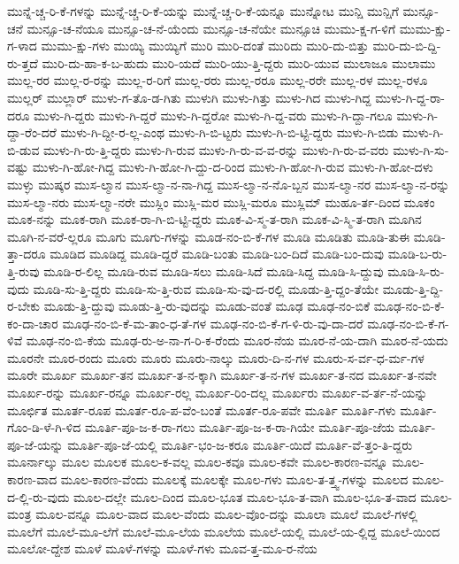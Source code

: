 {ಮುನ್ನೆ-ಚ್ಚ-ರಿ-ಕೆ-ಗಳನ್ನು
ಮುನ್ನೆ-ಚ್ಚ-ರಿ-ಕೆ-ಯನ್ನು
ಮುನ್ನೆ-ಚ್ಚ-ರಿ-ಕೆ-ಯನ್ನೂ
ಮುನ್ನೋಟ
ಮುನ್ಷಿ
ಮುನ್ಷಿಗೆ
ಮುನ್ಸೂ-ಚನೆ
ಮುನ್ಸೂ-ಚ-ನೆಯೂ
ಮುನ್ಸೂ-ಚ-ನೆ-ಯೆಂದು
ಮುನ್ಸೂ-ಚ-ನೆಯೇ
ಮುನ್ಸೂಚಿ
ಮುಮು-ಕ್ಷ-ಗ-ಳಿಗೆ
ಮುಮು-ಕ್ಷು-ಗ-ಳಾದ
ಮುಮು-ಕ್ಷು-ಗಳು
ಮುಯ್ಯಿ
ಮುಯ್ಯಿಗೆ
ಮುರಿ
ಮುರಿ-ದಂತೆ
ಮುರಿದು
ಮುರಿ-ದು-ಬಿತ್ತು
ಮುರಿ-ದು-ಬಿ-ದ್ದಿ-ರು-ತ್ತದೆ
ಮುರಿ-ದು-ಹಾ-ಕ-ಬ-ಹುದು
ಮುರಿ-ಯದೆ
ಮುರಿ-ಯು-ತ್ತಿ-ದ್ದರು
ಮುರಿ-ಯುವ
ಮುಲಾಜೂ
ಮುಲಾಮು
ಮುಲ್ಲ-ರರ
ಮುಲ್ಲ-ರ-ರನ್ನು
ಮುಲ್ಲ-ರ-ರಿಗೆ
ಮುಲ್ಲ-ರರು
ಮುಲ್ಲ-ರರೂ
ಮುಲ್ಲ-ರರೇ
ಮುಲ್ಲ-ರಳ
ಮುಲ್ಲ-ರಳೂ
ಮುಲ್ಲರ್
ಮುಲ್ಲಾರ್
ಮುಳು-ಗ-ತೊ-ಡ-ಗಿತು
ಮುಳುಗಿ
ಮುಳು-ಗಿತ್ತು
ಮುಳು-ಗಿದ
ಮುಳು-ಗಿದ್ದ
ಮುಳು-ಗಿ-ದ್ದ-ರಾ-ದರೂ
ಮುಳು-ಗಿ-ದ್ದರು
ಮುಳು-ಗಿ-ದ್ದರೆ
ಮುಳು-ಗಿ-ದ್ದರೋ
ಮುಳು-ಗಿ-ದ್ದ-ವರು
ಮುಳು-ಗಿ-ದ್ದಾ-ಗಲೂ
ಮುಳು-ಗಿ-ದ್ದಾ-ರೆಂ-ದರೆ
ಮುಳು-ಗಿ-ದ್ದೀ-ರ-ಲ್ಲ-ಎಂಥ
ಮುಳು-ಗಿ-ಬಿ-ಟ್ಟರು
ಮುಳು-ಗಿ-ಬಿ-ಟ್ಟಿ-ದ್ದರು
ಮುಳು-ಗಿ-ಬಿಡು
ಮುಳು-ಗಿ-ಬಿ-ಡುವ
ಮುಳು-ಗಿ-ರು-ತ್ತಿ-ದ್ದರು
ಮುಳು-ಗಿ-ರುವ
ಮುಳು-ಗಿ-ರು-ವ-ವ-ರನ್ನು
ಮುಳು-ಗಿ-ರು-ವ-ವರು
ಮುಳು-ಗಿ-ಸು-ವಷ್ಟು
ಮುಳು-ಗಿ-ಹೋ-ಗಿದ್ದ
ಮುಳು-ಗಿ-ಹೋ-ಗಿ-ದ್ದು-ದ-ರಿಂದ
ಮುಳು-ಗಿ-ಹೋ-ಗಿ-ರುವ
ಮುಳು-ಗಿ-ಹೋ-ದಳು
ಮುಳ್ಳು
ಮುಷ್ಕರ
ಮುಸ-ಲ್ಮಾನ
ಮುಸ-ಲ್ಮಾ-ನ-ನಾ-ಗಿದ್ದ
ಮುಸ-ಲ್ಮಾ-ನ-ನೊ-ಬ್ಬನ
ಮುಸ-ಲ್ಮಾ-ನರ
ಮುಸ-ಲ್ಮಾ-ನ-ರನ್ನು
ಮುಸ-ಲ್ಮಾ-ನರು
ಮುಸ-ಲ್ಮಾ-ನರೇ
ಮುಸ್ಲಿಂ
ಮುಸ್ಲಿ-ಮರ
ಮುಸ್ಲಿ-ಮರೂ
ಮುಸ್ಲಿಮ್
ಮುಹೂ-ರ್ತ-ದಿಂದ
ಮೂಕಂ
ಮೂಕ-ನನ್ನು
ಮೂಕ-ರಾಗಿ
ಮೂಕ-ರಾ-ಗಿ-ಬಿ-ಟ್ಟಿ-ದ್ದರು
ಮೂಕ-ವಿ-ಸ್ಮ-ತ-ರಾಗಿ
ಮೂಕ-ವಿ-ಸ್ಮಿ-ತ-ರಾಗಿ
ಮೂಗಿನ
ಮೂಗಿ-ನ-ವರೆ-ಲ್ಲರೂ
ಮೂಗು
ಮೂಗು-ಗಳನ್ನು
ಮೂಡ-ನಂ-ಬಿ-ಕೆ-ಗಳ
ಮೂಡಿ
ಮೂಡಿತು
ಮೂಡಿ-ತುಈ
ಮೂಡಿ-ತ್ತಾ-ದರೂ
ಮೂಡಿದ
ಮೂಡಿದ್ದ
ಮೂಡಿ-ದ್ದರೆ
ಮೂಡಿ-ಬಂತು
ಮೂಡಿ-ಬಂ-ದಿದೆ
ಮೂಡಿ-ಬಂ-ದುವು
ಮೂಡಿ-ಬ-ರು-ತ್ತಿ-ರುವು
ಮೂಡಿ-ರ-ಲಿಲ್ಲ
ಮೂಡಿ-ರುವ
ಮೂಡಿ-ಸಲು
ಮೂಡಿ-ಸಿದೆ
ಮೂಡಿ-ಸಿದ್ದ
ಮೂಡಿ-ಸಿ-ದ್ದುವು
ಮೂಡಿ-ಸಿ-ರು-ವುದು
ಮೂಡಿ-ಸು-ತ್ತಿ-ದ್ದರು
ಮೂಡಿ-ಸು-ತ್ತಿ-ರುವ
ಮೂಡಿ-ಸು-ವು-ದ-ರಲ್ಲಿ
ಮೂಡು-ತ್ತಿ-ದ್ದಂ-ತೆಯೇ
ಮೂಡು-ತ್ತಿ-ದ್ದಿ-ರ-ಬೇಕು
ಮೂಡು-ತ್ತಿ-ದ್ದುವು
ಮೂಡು-ತ್ತಿ-ರು-ವುದನ್ನು
ಮೂಡು-ವಂತೆ
ಮೂಢ
ಮೂಢ-ನಂ-ಬಿಕೆ
ಮೂಢ-ನಂ-ಬಿ-ಕೆ-ಕಂ-ದಾ-ಚಾರ
ಮೂಢ-ನಂ-ಬಿ-ಕೆ-ಮ-ತಾಂ-ಧ-ತೆ-ಗಳ
ಮೂಢ-ನಂ-ಬಿ-ಕೆ-ಗ-ಳಿ-ರು-ವು-ದಾ-ದರೆ
ಮೂಢ-ನಂ-ಬಿ-ಕೆ-ಗ-ಳಿವೆ
ಮೂಢ-ನಂ-ಬಿ-ಕೆಯ
ಮೂಢ-ರು-ಅ-ನಾ-ಗ-ರಿ-ಕ-ರೆಂದು
ಮೂರ-ನೆಯ
ಮೂರ-ನೆ-ಯ-ದಾಗಿ
ಮೂರ-ನೆ-ಯದು
ಮೂರನೇ
ಮೂರ-ರಂದು
ಮೂರು
ಮೂರು
ಮೂರು-ನಾಲ್ಕು
ಮೂರು-ದಿ-ನ-ಗಳ
ಮೂರು-ಸ-ರ್ವ-ಧ-ರ್ಮ-ಗಳ
ಮೂರೇ
ಮೂರ್ಖ
ಮೂರ್ಖ-ತನ
ಮೂರ್ಖ-ತ-ನ-ಕ್ಕಾಗಿ
ಮೂರ್ಖ-ತ-ನ-ಗಳ
ಮೂರ್ಖ-ತ-ನದ
ಮೂರ್ಖ-ತ-ನವೇ
ಮೂರ್ಖ-ರನ್ನು
ಮೂರ್ಖ-ರನ್ನೂ
ಮೂರ್ಖ-ರಲ್ಲ
ಮೂರ್ಖ-ರಿಂ-ದಲ್ಲ
ಮೂರ್ಖರು
ಮೂರ್ಖ-ವ-ರ್ತ-ನೆ-ಯನ್ನು
ಮೂರ್ಛಿತ
ಮೂರ್ತ-ರೂಪ
ಮೂರ್ತ-ರೂ-ಪ-ವೆಂ-ಬಂತೆ
ಮೂರ್ತ-ರೂ-ಪವೇ
ಮೂರ್ತಿ
ಮೂರ್ತಿ-ಗಳು
ಮೂರ್ತಿ-ಗೊಂ-ಡಿ-ಳೆ-ಗಿ-ಳಿದ
ಮೂರ್ತಿ-ಪೂ-ಜ-ಕ-ರಾ-ಗಲು
ಮೂರ್ತಿ-ಪೂ-ಜ-ಕ-ರಾ-ಗಿಯೇ
ಮೂರ್ತಿ-ಪೂ-ಜೆಯ
ಮೂರ್ತಿ-ಪೂ-ಜೆ-ಯನ್ನು
ಮೂರ್ತಿ-ಪೂ-ಜೆ-ಯಲ್ಲಿ
ಮೂರ್ತಿ-ಭಂ-ಜ-ಕರೂ
ಮೂರ್ತಿ-ಯಿದೆ
ಮೂರ್ತಿ-ವೆ-ತ್ತಂ-ತಿ-ದ್ದರು
ಮೂರ್ನಾಲ್ಕು
ಮೂಲ
ಮೂಲಕ
ಮೂಲ-ಕ-ವಲ್ಲ
ಮೂಲ-ಕವೂ
ಮೂಲ-ಕವೇ
ಮೂಲ-ಕಾರಣ-ವನ್ನೂ
ಮೂಲ-ಕಾರಣ-ವಾದ
ಮೂಲ-ಕಾರಣ-ವೆಂದು
ಮೂಲಕ್ಕೆ
ಮೂಲಕ್ಕೇ
ಮೂಲ-ಗಳು
ಮೂಲ-ತ-ತ್ತ್ವ-ಗಳನ್ನು
ಮೂಲದ
ಮೂಲ-ದ-ಲ್ಲಿ-ರು-ವುದು
ಮೂಲ-ದಲ್ಲೇ
ಮೂಲ-ದಿಂದ
ಮೂಲ-ಭೂತ
ಮೂಲ-ಭೂ-ತ-ವಾಗಿ
ಮೂಲ-ಭೂ-ತ-ವಾದ
ಮೂಲ-ಮಂತ್ರ
ಮೂಲ-ವನ್ನೂ
ಮೂಲ-ವಾದ
ಮೂಲ-ವೆಂದು
ಮೂಲ-ವೊಂ-ದನ್ನು
ಮೂಲಾ
ಮೂಲೆ
ಮೂಲೆ-ಗಳಲ್ಲಿ
ಮೂಲೆಗೆ
ಮೂಲೆ-ಮೂ-ಲೆಗೆ
ಮೂಲೆ-ಮೂ-ಲೆಯ
ಮೂಲೆಯ
ಮೂಲೆ-ಯಲ್ಲಿ
ಮೂಲೆ-ಯ-ಲ್ಲಿದ್ದ
ಮೂಲೆ-ಯಿಂದ
ಮೂಲೋ-ದ್ದೇಶ
ಮೂಳೆ
ಮೂಳೆ-ಗಳನ್ನು
ಮೂಳೆ-ಗಳು
ಮೂವ-ತ್ತ-ಮೂ-ರ-ನೆಯ
}
